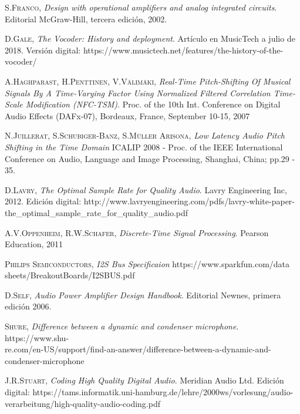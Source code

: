 \documentclass[a4paper, 11pt, oneside, openright]{report}
\begin{document}
\begin{thebibliography}{aa}
	\textsc{S.Franco},
	\textit{Design with operational amplifiers and analog integrated circuits}. Editorial McGraw-Hill, tercera edición, 2002.
	
	\textsc{D.Gale},
	\textit{The Vocoder: History and deployment}. Artículo en MusicTech a julio de 2018. Versión digital:
	https://www.musictech.net/features/the-history-of-the-vocoder/

	\textsc{A.Haghparast, H.Penttinen, V.Välimäki},
	\textit{Real-Time Pitch-Shifting Of Musical Signals By A Time-Varying Factor Using Normalized Filtered Correlation Time-Scale Modification (NFC-TSM)}.
	Proc. of the 10th Int. Conference on Digital Audio Effects (DAFx-07), Bordeaux, France, September 10-15, 2007
	
	\textsc{N.Juillerat, S.Schubiger-Banz, S.Müller Arisona},
	\textit{Low Latency Audio Pitch Shifting in the Time Domain}
	ICALIP 2008 - Proc. of the IEEE International Conference on Audio, Language and Image Processing, Shanghai, China; pp.29 - 35.
	
	\textsc{D.Lavry},
	\textit{The Optimal Sample Rate for Quality Audio}. Lavry Engineering Inc, 2012. Edición digital: http://www.lavryengineering.com/pdfs/lavry-white-paper-the\_optimal\_sample\_rate\_for\_quality\_audio.pdf
		
	\textsc{A.V.Oppenheim, R.W.Schafer},
	\textit{Discrete-Time Signal Processing}.
	Pearson Education, 2011

	\textsc{Philips Semiconductors},
	\textit{I2S Bus Specificaion}
	https://www.sparkfun.com/data\\sheets/BreakoutBoards/I2SBUS.pdf
	
	\textsc{D.Self},
	\textit{Audio Power Amplifier Design Handbook}. Editorial Newnes, primera edición 2006.
	
	\textsc{Shure},
	\textit{Difference between a dynamic and condenser microphone}. https://www.shu-\\re.com/en-US/support/find-an-answer/difference-between-a-dynamic-and-condenser-microphone
	
	\textsc{J.R.Stuart},
	\textit{Coding High Quality Digital Audio}. Meridian Audio Ltd. Edición\\ digital: https://tams.informatik.uni-hamburg.de/lehre/2000ws/vorlesung/audio-\\verarbeitung/high-quality-audio-coding.pdf


\end{thebibliography}
\end{document}
